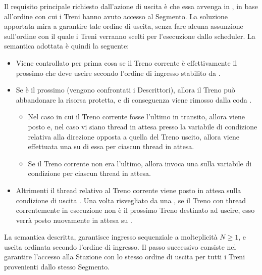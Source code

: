 \begin{description}
			Il requisito principale richiesto dall'azione di uscita è che essa avvenga in , in base all'ordine con cui i Treni hanno avuto accesso al Segmento. La soluzione apportata mira a garantire tale ordine di uscita, senza fare alcuna assunzione sull'ordine con il quale i Treni verranno scelti per l'esecuzione dallo scheduler. La semantica adottata è quindi la seguente:
			\begin{itemize}
				 \item Viene controllato per prima cosa se il Treno corrente è effettivamente il prossimo che deve uscire secondo l'ordine di ingresso stabilito da .
				 \item Se è il prossimo (vengono confrontati i Descrittori), allora il Treno può abbandonare la risorsa protetta, e di conseguenza viene rimosso dalla coda . 
				 \begin{itemize}
				 	\item Nel caso in cui il Treno corrente fosse l'ultimo in transito, allora viene posto  e, nel caso vi siano thread in attesa presso la variabile di condizione relativa alla direzione opposta a quella del Treno uscito, allora viene effettuata una  su di essa per ciascun thread in attesa. 
				 	\item Se il Treno corrente non era l'ultimo, allora invoca una  sulla variabile di condizione  per ciascun thread in attesa.
				 \end{itemize}
				 \item Altrimenti il thread relativo al Treno corrente viene posto in attesa sulla condizione di uscita . Una volta risvegliato da una , se il Treno con thread correntemente in esecuzione non è il prossimo Treno destinato ad uscire, esso verrà posto nuovamente in attesa su . 
			\end{itemize}
		\end {description}
	
	La semantica descritta, garantisce ingresso sequenziale a molteplicità $N\ge1$, e uscita ordinata secondo l'ordine di ingresso. Il passo successivo consiste nel garantire l'accesso alla Stazione con lo stesso ordine di uscita per tutti i Treni provenienti dallo stesso Segmento.


